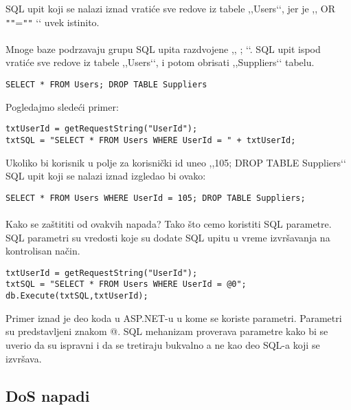 \documentclass[a4paper]{article}
\begin{document}
\noindent SQL upit koji se nalazi iznad vratiće sve redove iz tabele ,,Users‘‘, jer je ,, OR \texttt{"}\texttt{"}=\texttt{"}\texttt{"} ‘‘ uvek istinito. 

\paragraph{}
Mnoge baze podrzavaju grupu SQL upita razdvojene ,, ; ‘‘. SQL upit ispod vratiće sve redove iz tabele ,,Users‘‘, i potom obrisati ,,Suppliers‘‘ tabelu.

\begin{verbatim}
SELECT * FROM Users; DROP TABLE Suppliers
\end{verbatim}

\noindent Pogledajmo sledeći primer:

\begin{verbatim}
txtUserId = getRequestString("UserId");
txtSQL = "SELECT * FROM Users WHERE UserId = " + txtUserId;
\end{verbatim}

\noindent Ukoliko bi korisnik u polje za korisnički id uneo ,,105; DROP TABLE Suppliers‘‘ SQL upit koji se nalazi iznad izgledao bi ovako:

\begin{verbatim}
SELECT * FROM Users WHERE UserId = 105; DROP TABLE Suppliers; 
\end{verbatim}

\paragraph{}
Kako se zaštititi od ovakvih napada? Tako što cemo koristiti SQL parametre. SQL parametri su vredosti koje su dodate SQL upitu u vreme izvršavanja na kontrolisan način. 

\begin{verbatim}
txtUserId = getRequestString("UserId");
txtSQL = "SELECT * FROM Users WHERE UserId = @0";
db.Execute(txtSQL,txtUserId);
\end{verbatim}

\noindent Primer iznad je deo koda u ASP.NET-u u kome se koriste parametri. Parametri su predstavljeni znakom @. SQL mehanizam proverava parametre kako bi se uverio da su ispravni i da se tretiraju bukvalno a ne kao deo SQL-a koji se izvršava.


\subsection{DoS napadi}
\label{subsec:DoS}
\end{document}
